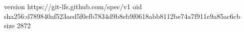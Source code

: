 version https://git-lfs.github.com/spec/v1
oid sha256:d789840af523aed5f0efb7834d9b8eb9f0618abb8112be74a7f911e9a85ac6cb
size 2872
